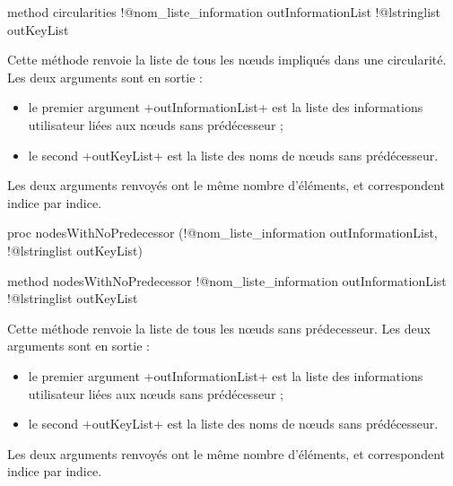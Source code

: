 \begin{galgas4}
method circularities !@nom_liste_information outInformationList
                   !@lstringlist outKeyList
\end{galgas4}

Cette méthode renvoie la liste de tous les nœuds impliqués dans une circularité. Les deux arguments sont en sortie :
\begin{itemize}
  \item le premier argument \ggsq+outInformationList+ est la liste des informations utilisateur liées aux nœuds sans prédécesseur ;
  \item le second \ggsq+outKeyList+ est la liste des noms de nœuds sans prédécesseur.
\end{itemize}

Les deux arguments renvoyés ont le même nombre d'éléments, et correspondent indice par indice.







\begin{galgas4}
proc nodesWithNoPredecessor (!@nom_liste_information outInformationList,
                           !@lstringlist outKeyList)
\end{galgas4}

\begin{galgas4}
method nodesWithNoPredecessor !@nom_liste_information outInformationList
                             !@lstringlist outKeyList
\end{galgas4}

Cette méthode renvoie la liste de tous les nœuds sans prédecesseur. Les deux arguments sont en sortie :
\begin{itemize}
  \item le premier argument \ggsq+outInformationList+ est la liste des informations utilisateur liées aux nœuds sans prédécesseur ;
  \item le second \ggsq+outKeyList+ est la liste des noms de nœuds sans prédécesseur.
\end{itemize}

Les deux arguments renvoyés ont le même nombre d'éléments, et correspondent indice par indice.







